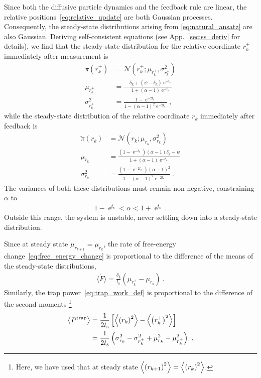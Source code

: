 \documentclass[%
reprint,
bibnotes, amsmath, amssymb, aps, pre,
 showkeys,
floatfix
]{revtex4-2}
\newcommand{\mrm}{\mathrm}
\newcommand{\mcal}{\mathcal}
\newcommand{\pr}[1]{\left(#1\right)} %
\newcommand{\sr}[1]{\left[#1\right]} %
\newcommand{\dg}{\delta_{\mrm{g}}}
\newcommand{\ts}{t_{\mrm{s}}}
\newcommand{\xkr}{r_{k}}
\newcommand{\xkrp}{r_{k+1}}
\newcommand{\xkpr}{r_{k}^{+}}
\newcommand{\ept}{\ev{P^{\mrm{trap}}}}
\newcommand{\epg}{\langle\dot{F}\rangle}
\DeclareMathOperator{\e}{e}
\begin{document}
Since both the diffusive particle dynamics and the feedback rule are linear, the relative positions~\eqref{eq:relative_update} are both Gaussian processes. 
Consequently, the steady-state distributions arising from \eqref{eq:natural_ansatz} are also Gaussian. 
Deriving self-consistent equations (see App.~\ref{sec:ss_deriv} for details), we find that the steady-state distribution for the relative coordinate $\xkpr$ immediately after measurement is 
\begin{subequations}\label{eq:ss_natural_dxkt}
    \begin{align}
        \pi\pr{\xkpr} &= \mcal{N}\pr{\xkpr; \mu_{\xkpr}, \sigma_{\xkpr}^{2}} \\[3pt]
        \mu_{\xkpr} &=  -\frac{\dg + (\psi-\dg)\e^{-\ts}}{1+(\alpha-1)\e^{-\ts}} \\[3pt] 
        \sigma_{\xkpr}^{2} &= \frac{1-\e^{-2\ts}}{1-(\alpha-1)^{2}\e^{-2\ts}}\ ,
    \end{align}
\end{subequations}
while the steady-state distribution of the relative coordinate $\xkr$ immediately after feedback is
\begin{subequations}\label{eq:ss_natural_xkr}
    \begin{align}
        \tilde{\pi}\pr{\xkr} &= \mcal{N}\pr{\xkr; \mu_{\xkr}, \sigma_{\xkr}^{2}}\\[3pt]
        \mu_{\xkr} &= \frac{\pr{1-\e^{-\ts}}(\alpha-1)\dg-\psi}{1+(\alpha-1)\e^{-\ts}}\\[3pt]
        \sigma_{\xkr}^{2} &= \frac{\pr{1-\e^{-2\ts}} (\alpha-1)^{2}}{1-(\alpha-1)^{2}\e^{-2\ts}}\ .
    \end{align}
\end{subequations}
The variances of both these distributions must remain non-negative, constraining $\alpha$ to 
\begin{align}
    1-\e^{\ts} < \alpha < 1+\e^{\ts} \ .\label{eq:alpha_constraint}
\end{align}
Outside this range, the system is unstable, never settling down into a steady-state distribution.

Since at steady state $\mu_{\xkrp}=\mu_{\xkr}$, the rate of free-energy change~\eqref{eq:free_energy_change} is proportional to the difference of the means of the steady-state distributions, 
\begin{align}
    \epg = \frac{\dg}{\ts}\pr{\mu_{\xkpr}-\mu_{\xkr}} \ .\label{eq:grav_astz_power_rel_coords}
\end{align}
Similarly, the trap power~\eqref{eq:trap_work_def} is proportional to the difference of the second moments \footnote{Here, we have used that at steady state $\ev{\pr{\xkrp}^{2}} = \ev{\pr{\xkr}^{2}}$.}
\begin{subequations}\label{eq:trap_astz_power_rel_coords}
    \begin{align}
        \ept &= \frac{1}{2\ts}\sr{\ev{\pr{\xkr}^{2}}-\ev{\pr{\xkpr}^{2}}}\\
        &= \frac{1}{2\ts}\pr{\sigma_{\xkr}^{2} - \sigma_{\xkpr}^{2} + \mu_{\xkr}^{2} - \mu_{\xkpr}^{2}} \ .
    \end{align}
\end{subequations}
\end{document}
